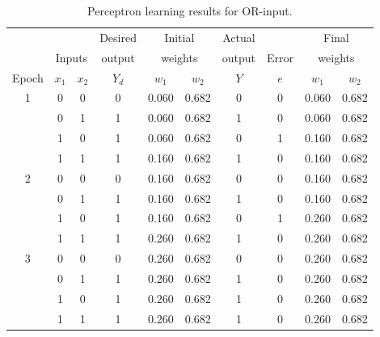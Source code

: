 \begin{table}
\centering
\begin{tabular}{cccccccccc}
\toprule
& & & Desired  & \multicolumn{2}{c}{Initial} & Actual & & \multicolumn{2}{c}{Final} \\
& \multicolumn{2}{c}{Inputs} & output & \multicolumn{2}{c}{weights} & output & Error & \multicolumn{2}{c}{weights} \\
Epoch & $x_1$ & $x_2$ & $Y_d$ & $w_1$ & $w_2$ & $Y$ & $e$ & $w_1$ & $w_2$ \\
\midrule
1 & 0 & 0 & 0 & 0.060 & 0.682 & 0 & 0 & 0.060 & 0.682 \\
  & 0 & 1 & 1 & 0.060 & 0.682 & 1 & 0 & 0.060 & 0.682 \\
  & 1 & 0 & 1 & 0.060 & 0.682 & 0 & 1 & 0.160 & 0.682 \\
  & 1 & 1 & 1 & 0.160 & 0.682 & 1 & 0 & 0.160 & 0.682 \\
2 & 0 & 0 & 0 & 0.160 & 0.682 & 0 & 0 & 0.160 & 0.682 \\
  & 0 & 1 & 1 & 0.160 & 0.682 & 1 & 0 & 0.160 & 0.682 \\
  & 1 & 0 & 1 & 0.160 & 0.682 & 0 & 1 & 0.260 & 0.682 \\
  & 1 & 1 & 1 & 0.260 & 0.682 & 1 & 0 & 0.260 & 0.682 \\
3 & 0 & 0 & 0 & 0.260 & 0.682 & 0 & 0 & 0.260 & 0.682 \\
  & 0 & 1 & 1 & 0.260 & 0.682 & 1 & 0 & 0.260 & 0.682 \\
  & 1 & 0 & 1 & 0.260 & 0.682 & 1 & 0 & 0.260 & 0.682 \\
  & 1 & 1 & 1 & 0.260 & 0.682 & 1 & 0 & 0.260 & 0.682 \\
\bottomrule
\end{tabular}
\caption{Perceptron learning results for \textsc{OR}-input.}
\label{table:or}
\end{table}




